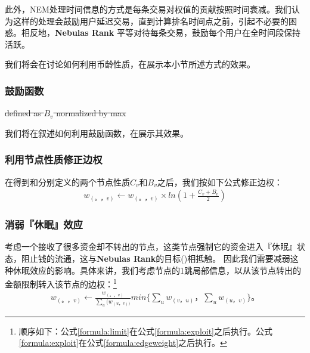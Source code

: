 

此外，NEM处理时间信息的方式是每条交易对权值的贡献按照时间衰减\cite{nem}。我们认为这样的处理会鼓励用户延迟交易，直到计算排名时间点之前，引起不必要的困惑。相反地，\textbf{Nebulas Rank} 平等对待每条交易，鼓励每个用户在全时间段保持活跃。

我们将会在讨论如何利用币龄性质，在展示本小节所述方式的效果。


\subsubsection{鼓励函数}\label{subsec:encouragement}
 \st{defined as $B_v$ normalized by max}

我们将在叙述如何利用鼓励函数，在展示其效果。

\subsubsection{利用节点性质修正边权} \label{subsec:reduction}
在得到和分别定义的两个节点性质$C_v$和$B_v$之后，我们按如下公式修正边权：
\begin{align}\label{formula:exploit}
	w_{(。，v)} \leftarrow w_{(。，v)} \times ln(1 + \frac{C_v + B_v}{2})
\end{align}

\subsubsection{消弱『休眠』效应} \label{subsec:limit}
考虑一个接收了很多资金却不转出的节点，这类节点强制它的资金进入『休眠』状态，阻止钱的流通，这与\textbf{Nebulas Rank}的目标()相抵触。 因此我们需要减弱这种休眠效应的影响。具体来讲，我们考虑节点的1跳局部信息，以从该节点转出的金额限制转入该节点的边权：\footnote{顺序如下：公式\ref{formula:limit}在公式\ref{formula:exploit}之后执行。公式\ref{formula:exploit}在公式\ref{formula:edgeweight}之后执行。}
\begin{align}
\label{formula:limit}
w_{(。，v)} \leftarrow  \frac{w_{(。，v)}}{\sum_u(w_{(u，v))}} min\{ \sum_u{w_{(v，u)}}， \sum_u{w_{(u，v)}} \}。
\end{align}

